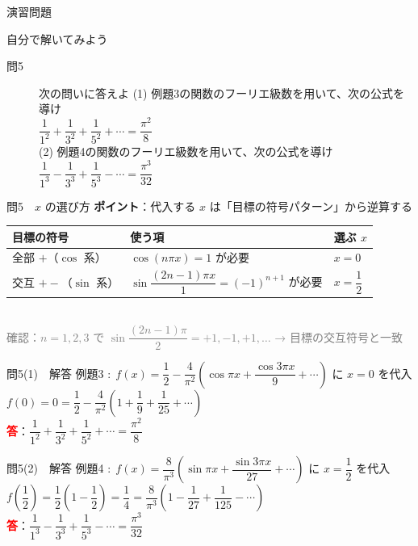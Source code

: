 \documentclass[professionalfonts]{beamer}
\begin{document}
\begin{frame}{演習問題}
  \begin{exampleblock}{自分で解いてみよう}
  \begin{description}
    \item[問5] 次の問いに答えよ
    (1) 例題3の関数のフーリエ級数を用いて、次の公式を導け\\
    $\dfrac{1}{1^{2}} + \dfrac{1}{3^{2}} + \dfrac{1}{5^{2}} + \cdots = \dfrac{\pi^{2}}{8}$\\[4pt]
    (2) 例題4の関数のフーリエ級数を用いて、次の公式を導け\\
    $\dfrac{1}{1^{3}} - \dfrac{1}{3^{3}} + \dfrac{1}{5^{3}} - \cdots = \dfrac{\pi^{3}}{32}$\\
  \end{description}
  \end{exampleblock}
\end{frame}

\begin{frame}{問5　$x$ の選び方}
  \textbf{ポイント}：代入する $x$ は「目標の符号パターン」から逆算する\\[8pt]
  \begin{tabular}{lll}
    \hline
    目標の符号 & 使う項 & 選ぶ $x$ \\
    \hline
    全部 $+$（$\cos$ 系） & $\cos(n\pi x)=1$ が必要 & $x=0$ \\
    交互 $+-$（$\sin$ 系） & $\sin\dfrac{(2n-1)\pi x}{1}=(-1)^{n+1}$ が必要 & $x=\dfrac{1}{2}$ \\
    \hline
  \end{tabular}\\[8pt]
  {\footnotesize\textcolor{gray}{確認：$n=1,2,3$ で $\sin\dfrac{(2n-1)\pi}{2}=+1,-1,+1,\ldots$ → 目標の交互符号と一致}}
\end{frame}

\begin{frame}{問5(1)　解答}
  例題3 $:\; f(x) = \dfrac{1}{2} - \dfrac{4}{\pi^{2}}\!\left(\cos \pi x + \dfrac{\cos 3\pi x}{9} + \cdots\right)$ に $x=0$ を代入\\[6pt]
  $f(0) = 0 = \dfrac{1}{2} - \dfrac{4}{\pi^{2}}\!\left(1 + \dfrac{1}{9} + \dfrac{1}{25} + \cdots\right)$
  \\[8pt]\textcolor{red}{\textbf{答}}：$\dfrac{1}{1^{2}} + \dfrac{1}{3^{2}} + \dfrac{1}{5^{2}} + \cdots = \dfrac{\pi^{2}}{8}$
\end{frame}

\begin{frame}{問5(2)　解答}
  例題4 $:\; f(x) = \dfrac{8}{\pi^{3}}\!\left(\sin \pi x + \dfrac{\sin 3\pi x}{27} + \cdots\right)$ に $x=\dfrac{1}{2}$ を代入\\[6pt]
  $f\!\left(\dfrac{1}{2}\right) = \dfrac{1}{2}\!\left(1-\dfrac{1}{2}\right) = \dfrac{1}{4} = \dfrac{8}{\pi^{3}}\!\left(1 - \dfrac{1}{27} + \dfrac{1}{125} - \cdots\right)$
  \\[8pt]\textcolor{red}{\textbf{答}}：$\dfrac{1}{1^{3}} - \dfrac{1}{3^{3}} + \dfrac{1}{5^{3}} - \cdots = \dfrac{\pi^{3}}{32}$
\end{frame}
\end{document}
